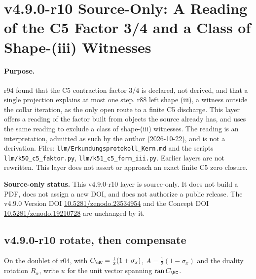 \clearpage
\section*{v4.9.0-r10 Source-Only: A Reading of the C5 Factor 3/4 and a Class of Shape-(iii) Witnesses}
\label{sec:v490-r10-c5-factor-shape-three}

\paragraph{Purpose.}
r94 found that the C5 contraction factor \(3/4\) is declared, not derived, and that a single projection explains at most
one step.  r88 left shape (iii), a witness outside the collar iteration, as the only open route to a finite C5 discharge.
This layer offers a reading of the factor built from objects the source already has, and uses the same reading to
exclude a class of shape-(iii) witnesses.  The reading is an interpretation, admitted as such by the author
(2026-10-22), and is not a derivation.  Files: \texttt{llm/Erkundungsprotokoll\_Kern.md} and the scripts
\texttt{llm/k50\_c5\_faktor.py}, \texttt{llm/k51\_c5\_form\_iii.py}.  Earlier layers are not rewritten.
This layer does not assert or approach an exact finite C5 zero closure.

\noindent\textbf{Source-only status.}
This v4.9.0-r10 layer is source-only.  It does not build a PDF, does not assign a new DOI,
and does not authorize a public release.  The v4.9.0 Version DOI
\href{https://doi.org/10.5281/zenodo.23534954}{10.5281/zenodo.23534954} and the Concept DOI
\href{https://doi.org/10.5281/zenodo.19210728}{10.5281/zenodo.19210728} are unchanged by it.

\subsection*{v4.9.0-r10 rotate, then compensate}
\label{subsec:v490-r10-rotate-compensate}

On the doublet of r04, with \(C_{\HC}=\tfrac12(1+\sigma_x)\), \(A=\tfrac12(1-\sigma_x)\) and the duality rotation
\(R_\alpha\), write \(u\) for the unit vector spanning \(\operatorname{ran}C_{\HC}\).

